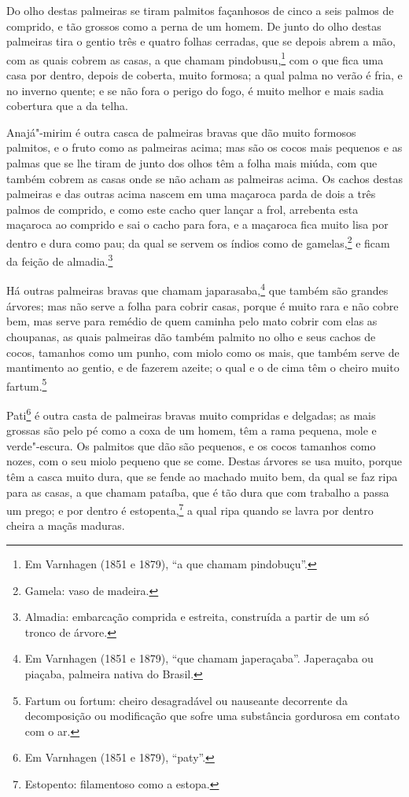 \begin{linenumbers}
Do olho destas palmeiras se tiram palmitos façanhosos de cinco a seis palmos de comprido,
e tão grossos como a perna de um homem. De junto do olho destas palmeiras tira o gentio
três e quatro folhas cerradas, que se depois abrem a mão, com as quais cobrem as casas, a
que chamam pindobusu,\footnote{ Em Varnhagen (1851 e 1879), ``a que chamam pindobuçu''.}
com o que fica uma casa por dentro, depois de coberta, muito formosa; a qual palma no
verão é fria, e no inverno quente; e se não fora o perigo do fogo, é muito melhor e mais
sadia cobertura que a da telha.

Anajá"-mirim é outra casca de palmeiras bravas que dão muito formosos palmitos, e o fruto
como as palmeiras acima; mas são os cocos mais pequenos e as palmas que se lhe tiram de
junto dos olhos têm a folha mais miúda, com que também cobrem as casas onde se não acham
as palmeiras acima. Os cachos destas palmeiras e das outras acima nascem em uma maçaroca
parda de dois a três palmos de comprido, e como este cacho quer lançar a frol, arrebenta
esta maçaroca ao comprido e sai o cacho para fora, e a maçaroca fica muito lisa por dentro
e dura como pau; da qual se servem os índios como de gamelas,\footnote{ Gamela: vaso de
madeira.} e ficam da feição de almadia.\footnote{ Almadia: embarcação comprida e estreita,
construída a partir de um só tronco de árvore.}

Há outras palmeiras bravas que chamam japarasaba,\footnote{ Em Varnhagen (1851 e 1879),
``que chamam japeraçaba''. Japeraçaba ou piaçaba, palmeira nativa do Brasil.} que também
são grandes árvores; mas não serve a folha para cobrir casas, porque é muito rara e não
cobre bem, mas serve para remédio de quem caminha pelo mato cobrir com elas as choupanas,
as quais palmeiras dão também palmito no olho e seus cachos de cocos, tamanhos como um
punho, com miolo como os mais, que também serve de mantimento ao gentio, e de fazerem
azeite; o qual e o de cima têm o cheiro muito fartum.\footnote{ Fartum ou fortum: cheiro
desagradável ou nauseante decorrente da decomposição ou modificação que sofre uma
substância gordurosa em contato com o ar.}

Pati\footnote{ Em Varnhagen (1851 e 1879), ``paty''.} é outra casta de palmeiras bravas
muito compridas e delgadas; as mais grossas são pelo pé como a coxa de um homem, têm a
rama pequena, mole e verde"-escura. Os palmitos que dão são pequenos, e os cocos tamanhos
como nozes, com o seu miolo pequeno que se come. Destas árvores se usa muito, porque têm a
casca muito dura, que se fende ao machado muito bem, da qual se faz ripa para as casas, a
que chamam pataíba, que é tão dura que com trabalho a passa um prego; e por dentro é
estopenta,\footnote{ Estopento: filamentoso como a estopa.} a qual ripa quando se lavra
por dentro cheira a maçãs maduras.



\end{linenumbers}
